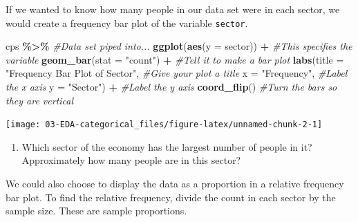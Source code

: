 \documentclass[
]{report}
\newenvironment{Shaded}{\begin{snugshade}}{\end{snugshade}}
\newcommand{\CommentTok}[1]{\textcolor[rgb]{0.56,0.35,0.01}{\textit{#1}}}
\newcommand{\DataTypeTok}[1]{\textcolor[rgb]{0.13,0.29,0.53}{#1}}
\newcommand{\KeywordTok}[1]{\textcolor[rgb]{0.13,0.29,0.53}{\textbf{#1}}}
\newcommand{\NormalTok}[1]{#1}
\newcommand{\OperatorTok}[1]{\textcolor[rgb]{0.81,0.36,0.00}{\textbf{#1}}}
\newcommand{\StringTok}[1]{\textcolor[rgb]{0.31,0.60,0.02}{#1}}
\providecommand{\tightlist}{%
  \setlength{\itemsep}{0pt}\setlength{\parskip}{0pt}}
\begin{document}
If we wanted to know how many people in our data set were in each sector, we would create a frequency bar plot of the variable \texttt{sector}.

\begin{Shaded}
\begin{Highlighting}[]
\NormalTok{cps }\OperatorTok{\%\textgreater{}\%}\StringTok{ }\CommentTok{\#Data set piped into...}
\KeywordTok{ggplot}\NormalTok{(}\KeywordTok{aes}\NormalTok{(}\DataTypeTok{y =}\NormalTok{ sector)) }\OperatorTok{+}\StringTok{   }\CommentTok{\#This specifies the variable}
\StringTok{  }\KeywordTok{geom\_bar}\NormalTok{(}\DataTypeTok{stat =} \StringTok{"count"}\NormalTok{) }\OperatorTok{+}\StringTok{  }\CommentTok{\#Tell it to make a bar plot}
\StringTok{  }\KeywordTok{labs}\NormalTok{(}\DataTypeTok{title =} \StringTok{"Frequency Bar Plot of Sector"}\NormalTok{,  }\CommentTok{\#Give your plot a title}
       \DataTypeTok{x =} \StringTok{"Frequency"}\NormalTok{,   }\CommentTok{\#Label the x axis}
       \DataTypeTok{y =} \StringTok{"Sector"}\NormalTok{)  }\OperatorTok{+}\StringTok{ }\CommentTok{\#Label the y axis}
\StringTok{  }\KeywordTok{coord\_flip}\NormalTok{()  }\CommentTok{\#Turn the bars so they are vertical}
\end{Highlighting}
\end{Shaded}

\begin{center}\texttt{[image: 03-EDA-categorical\_files/figure-latex/unnamed-chunk-2-1]} \end{center}

\begin{enumerate}
\def\labelenumi{\arabic{enumi}.}
\setcounter{enumi}{3}
\tightlist
\item
  Which sector of the economy has the largest number of people in it? Approximately how many people are in this sector?
\end{enumerate}

\vspace{0.3in}

We could also choose to display the data as a proportion in a relative frequency bar plot. To find the relative frequency, divide the count in each sector by the sample size. These are sample proportions.
\end{document}
